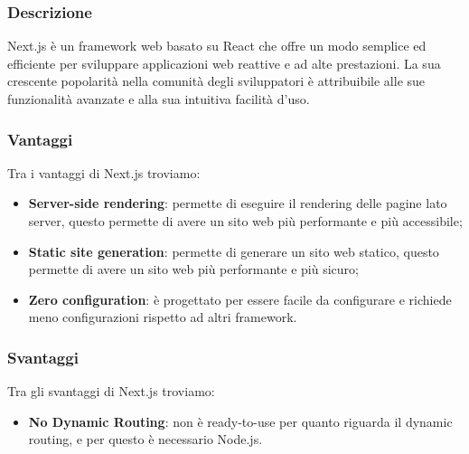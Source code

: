 \subsubsection*{Descrizione}
Next.js è un framework web basato su React che offre un modo semplice ed efficiente per sviluppare applicazioni web reattive e ad alte prestazioni. La sua crescente popolarità nella comunità degli sviluppatori è attribuibile alle sue funzionalità avanzate e alla sua intuitiva facilità d'uso.

\subsubsection*{Vantaggi}
Tra i vantaggi di Next.js troviamo:
\begin{itemize}
    \item \textbf{Server-side rendering}: permette di eseguire il rendering delle pagine lato server, questo permette di avere un sito web più performante e più accessibile;
    \item \textbf{Static site generation}: permette di generare un sito web statico, questo permette di avere un sito web più performante e più sicuro;
    \item \textbf{Zero configuration}: è progettato per essere facile da configurare e richiede meno configurazioni rispetto ad altri framework.
\end{itemize}

\subsubsection*{Svantaggi}
Tra gli svantaggi di Next.js troviamo:
\begin{itemize}
    \item \textbf{No Dynamic Routing}: non è ready-to-use per quanto riguarda il dynamic routing, e per questo è necessario Node.js.
\end{itemize}



